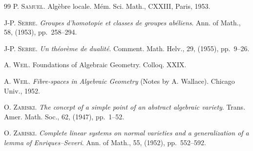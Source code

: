 \begin{thebibliography}{99}
\label{fac:bib:13}
P. \textsc{Samuel}. Algèbre locale. Mém. Sci. Math., CXXIII, Paris, 1953.

\label{fac:bib:14}
J-P. \textsc{Serre}. \textit{Groupes d'homotopie et classes de groupes
abéliens}. Ann. of Math., 58, (1953), pp.~258--294.

\label{fac:bib:15}
J-P. \textsc{Serre}. \textit{Un théorème de dualité}. Comment. Math.
Helv., 29, (1955), pp.~9--26.

\label{fac:bib:16}
A. \textsc{Weil}. Foundations of Algebraic Geometry. Colloq. XXIX.

\label{fac:bib:17}
A. \textsc{Weil}. \textit{Fibre-spaces in Algebraic Geometry} (Notes by
A. Wallace). Chicago Univ., 1952.

\label{fac:bib:18}
O. \textsc{Zariski}. \textit{The concept of a simple point of an abstract
algebraic variety}. Trans. Amer. Math. Soc., 62, (1947), pp.~1--52.

\label{fac:bib:19}
O. \textsc{Zariski}. \textit{Complete linear systems on normal varieties
and a generalization of a lemma of Enriques--Severi}. Ann. of Math., 55,
(1952), pp.~552--592.

\end{thebibliography}
